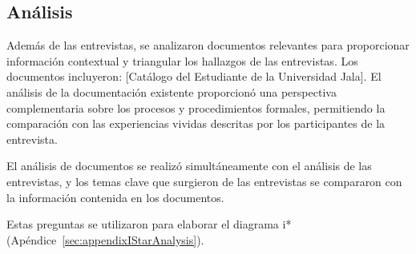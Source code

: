 \subsection*{Análisis}

Además de las entrevistas, se analizaron documentos relevantes para proporcionar información contextual y triangular los hallazgos de las entrevistas.
Los documentos incluyeron: [Catálogo del Estudiante de la Universidad Jala].
El análisis de la documentación existente proporcionó una perspectiva complementaria sobre los procesos y procedimientos formales, permitiendo la comparación con las experiencias vividas descritas por los participantes de la entrevista.

El análisis de documentos se realizó simultáneamente con el análisis de las entrevistas, y los temas clave que surgieron de las entrevistas se compararon con la información contenida en los documentos.

Estas preguntas se utilizaron para elaborar el diagrama i* (Apéndice~\ref{sec:appendixIStarAnalysis}).
